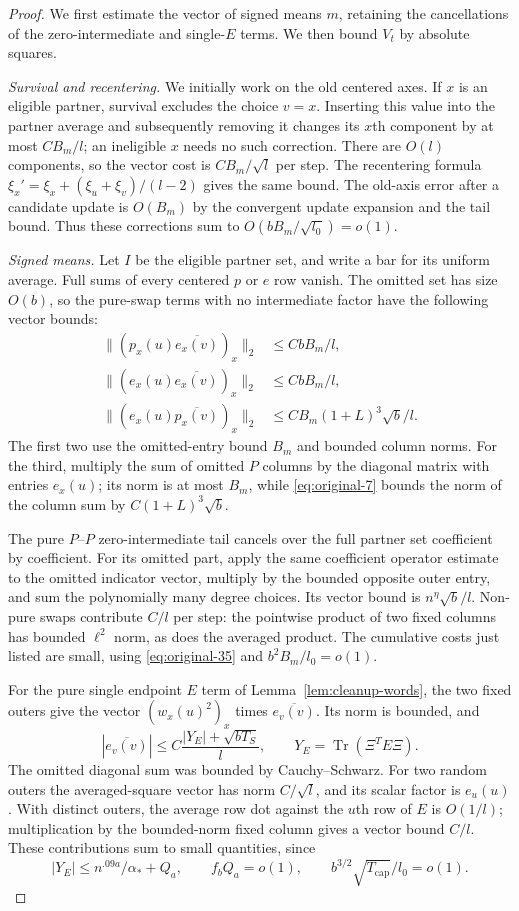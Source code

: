 \begin{proof}
We first estimate the vector of signed means $m$, retaining the
cancellations of the zero-intermediate and single-$E$ terms.  We then
bound $V_t$ by absolute squares.

\emph{Survival and recentering.}
We initially work on the old centered axes.  If $x$ is an eligible
partner, survival excludes the choice $v=x$.  Inserting this value
into the partner average and subsequently removing it changes its
$x$th component by at most $CB_m/l$; an ineligible $x$ needs no such
correction.  There are $O(l)$ components,
so the vector cost is $CB_m/\sqrt l$ per step.  The recentering
formula
$\xi_x'=\xi_x+(\xi_u+\xi_v)/(l-2)$ gives the same bound.
The old-axis error after a candidate update is $O(B_m)$ by the
convergent update expansion and the tail bound.  Thus these
corrections sum to $O(bB_m/\sqrt{l_0})=o(1)$.

\emph{Signed means.}
Let $I$ be the eligible partner set, and write a bar for its
uniform average.  Full sums of every centered $p$ or $e$ row
vanish.  The omitted set has size $O(b)$, so the pure-swap terms
with no intermediate factor have the following vector bounds:
\[
\begin{split}
 \|(p_x(u)\overline{e_x(v)})_x\|_2
       &\leq CbB_m/l,\\
 \|(e_x(u)\overline{e_x(v)})_x\|_2
       &\leq CbB_m/l,\\
 \|(e_x(u)\overline{p_x(v)})_x\|_2
       &\leq CB_m(1+L)^3\sqrt b/l.
\end{split}
\]
The first two use the omitted-entry bound $B_m$ and bounded column
norms.  For the third, multiply the sum of omitted $P$ columns by
the diagonal matrix with entries $e_x(u)$; its norm is at most
$B_m$, while \eqref{eq:original-7} bounds the norm of the column
sum by $C(1+L)^3\sqrt b$.

The pure $P$--$P$ zero-intermediate tail cancels over the full
partner set coefficient by coefficient.  For its omitted part,
apply the same coefficient operator estimate to the omitted
indicator vector, multiply by the bounded opposite outer entry,
and sum the polynomially many degree choices.  Its vector bound
is $n^\eta\sqrt b/l$.  Non-pure swaps contribute $C/l$ per
step: the pointwise product of two fixed columns has bounded
$\ell^2$ norm, as does the averaged product.  The cumulative
costs just listed are small, using \eqref{eq:original-35} and
$b^2B_m/l_0=o(1)$.

For the pure single endpoint $E$ term of
Lemma~\ref{lem:cleanup-words}, the two fixed outers give the
vector $(w_x(u)^2)_x$ times $\overline{e_v(v)}$.  Its norm is
bounded, and
\[
 |\overline{e_v(v)}|
      \leq C\frac{|Y_E|+\sqrt{bT_S}}l,
 \qquad Y_E=\operatorname{Tr}(\Xi^TE\Xi).
\]
The omitted diagonal sum was bounded by Cauchy--Schwarz.  For two
random outers the averaged-square vector has norm $C/\sqrt l$,
and its scalar factor is $e_u(u)$.  With distinct outers, the
average row dot against the $u$th row of $E$ is $O(1/l)$;
multiplication by the bounded-norm fixed column gives a vector
bound $C/l$.  These contributions sum to small quantities, since
\[
 |Y_E|\leq n^{.09a}/\alpha_*+Q_a,\qquad
 f_bQ_a=o(1),\qquad
 b^{3/2}\sqrt{T_{\mathrm{cap}}}/l_0=o(1).
\]


\end{proof}
